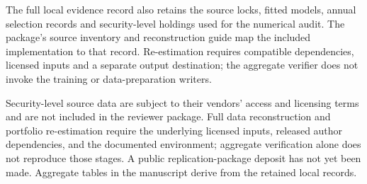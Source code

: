 \documentclass[12pt,letterpaper,fleqn]{article}
\begin{document}
The full local evidence record also retains the source locks, fitted models, annual selection records and security-level holdings used for the numerical audit. The package's source inventory and reconstruction guide map the included implementation to that record. Re-estimation requires compatible dependencies, licensed inputs and a separate output destination; the aggregate verifier does not invoke the training or data-preparation writers.

Security-level source data are subject to their vendors' access and licensing terms and are not included in the reviewer package. Full data reconstruction and portfolio re-estimation require the underlying licensed inputs, released author dependencies, and the documented environment; aggregate verification alone does not reproduce those stages. A public replication-package deposit has not yet been made. Aggregate tables in the manuscript derive from the retained local records.
\end{document}
